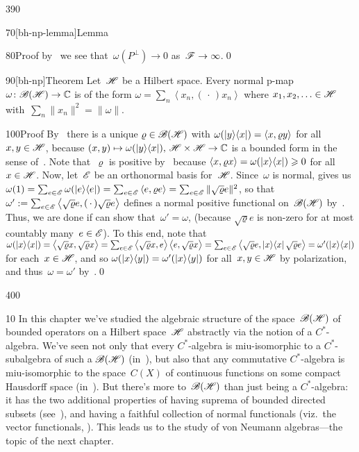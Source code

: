 \begin{parsec}{390}
\begin{point}{70}[bh-np-lemma]{Lemma}
\begin{point}{80}{Proof}
by~
we see that~$\omega(P^\perp)\to0$
as~$\mathscr{F}\to\infty$.\qed
\end{point}
\end{point}
\begin{point}{90}[bh-np]{Theorem}%
%
Let~$\mathscr{H}$ be a Hilbert space.
Every normal p-map $\omega\colon \mathscr{B}(\mathscr{H})\to \mathbb{C}$
is of the form $\omega = \sum_n\left<x_n,(\,\cdot\,)x_n\right>$
where $x_1,x_2,\dotsc\in \mathscr{H}$
with~$\sum_n \|x_n\|^2=\|\omega\|$.
\begin{point}{100}{Proof}%
By~
there is a
unique
$\varrho\in\mathscr{B}(\mathscr{H})$
with $\omega(\left|y\right>\!\left<x\right|)=\left<x,\varrho y\right>$
for all~$x,y\in\mathscr{H}$,
because
$(x,y)\mapsto \omega(\left|y\right>\!\left<x\right|),\,
\mathscr{H}\times\mathscr{H}\to\mathbb{C}$
is a bounded form in the sense of~.
Note that~$\varrho$ 
is positive by~
because $\left<x,\varrho x\right>
=\omega(\left|x\right>\!\left<x\right|)\geqslant 0$
for all~$x\in\mathscr{H}$.
Now, let~$\mathscr{E}$ be an orthonormal basis for~$\mathscr{H}$.
Since~$\omega$ is normal,
 gives us
$\omega(1)=\sum_{e\in\mathscr{E}} \omega(\left|e\right>\!\left<e\right|)
= \sum_{e\in\mathscr{E}} \left<e,\varrho e\right>
= \sum_{e\in \mathscr{E}} \|\sqrt{\varrho} e\|^2$,
so that $\omega':=\sum_{e\in\mathscr{E}} \left<\sqrt{\varrho}e,(\,\cdot\,)
\sqrt{\varrho}e\right>$
defines a normal positive functional on~$\mathscr{B}(\mathscr{H})$
by~.
Thus,
we are done if
can show that~$\omega'=\omega$,
(because $\sqrt{\varrho}e$
is non-zero for at most countably many~$e\in\mathscr{E}$).
To this end,
note that
$\omega(\left|x\right>\!\left<x\right|)
= \left<\sqrt{\varrho}x,\sqrt{\varrho}x\right>
= \sum_{e\in \mathscr{E}}
\left<\sqrt{\varrho}x,e\right>
\left<e,\sqrt{\varrho}x\right>
= \sum_{e\in \mathscr{E}} \left< \sqrt{\varrho}e,
\left|x\right>\!\left<x\right| \sqrt{\varrho}e \right>
=\omega'(\left|x\right>\!\left<x\right|)$
for each~$x\in\mathscr{H}$,
and so $\omega(\left|x\right>\!\left<y\right|)=\omega'(\left|x\right>\!\left<y\right|)$
for all~$x,y\in\mathscr{H}$
by polarization,
and thus~$\omega=\omega'$
by~.\qed
\end{point}
\end{point}
\end{parsec}
\begin{parsec}{400}
\begin{point}{10}
In this chapter
we've studied
the algebraic  structure of 
the space~$\mathscr{B}(\mathscr{H})$
of bounded operators on a Hilbert space~$\mathscr{H}$
abstractly 
via the notion
of
a $C^*$-algebra.
We've seen not only that every $C^*$-algebra
is miu-isomorphic to a $C^*$-subalgebra
	of such a $\mathscr{B}(\mathscr{H})$ (in~),
but also that any commutative $C^*$-algebra
is miu-isomorphic
to the space~$C(X)$ of continuous functions
	on some compact Hausdorff space (in~).
But there's more to~$\mathscr{B}(\mathscr{H})$
than just being a $C^*$-algebra:
it has the two additional properties
of having suprema of bounded directed subsets (see~),
and having a faithful collection 
of normal functionals (viz.~the vector functionals,
).
This leads us to the study of von Neumann algebras---the topic
of the next chapter.
\end{point}
\end{parsec}
